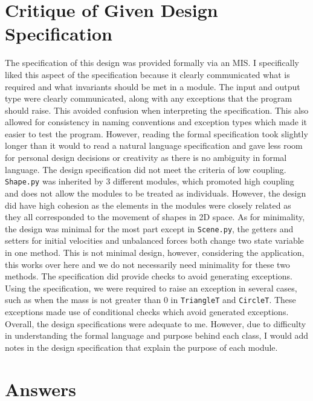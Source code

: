 \documentclass[12pt]{article}
\begin{document}
\section{Critique of Given Design Specification}
The specification of this design was provided formally via an MIS. I specifically liked this aspect of the specification because it clearly communicated what is required and what invariants should be met in a module. The input and output type were clearly communicated, along with any exceptions that the program should raise. This avoided confusion when interpreting the specification. This also allowed for consistency in naming conventions and exception types which made it easier to test the program. However, reading the formal specification took slightly longer than it would to read a natural language specification and gave less room for personal design decisions or creativity as there is no ambiguity in formal language. 
The design specification did not meet the criteria of low coupling. \texttt{Shape.py} was inherited by 3 different modules, which promoted high coupling and does not allow the modules to be treated as individuals. However, the design did have high cohesion as the elements in the modules were closely related as they all corresponded to the movement of shapes in 2D space.
As for minimality, the design was minimal for the most part except in \texttt{Scene.py}, the getters and setters for initial velocities and unbalanced forces both change two state variable in one method. This is not minimal design, however, considering the application, this works over here and we do not necessarily need minimality for these two methods.
The specification did provide checks to avoid generating exceptions. Using the specification, we were required to raise an exception in several cases, such as when the mass is not greater than 0 in \texttt{TriangleT} and \texttt{CircleT}. These exceptions made use of conditional checks which avoid generated exceptions.
Overall, the design specifications were adequate to me. However, due to difficulty in understanding the formal language and purpose behind each class, I would add notes in the design specification that explain the purpose of each module.


\section{Answers}
\end{document}

